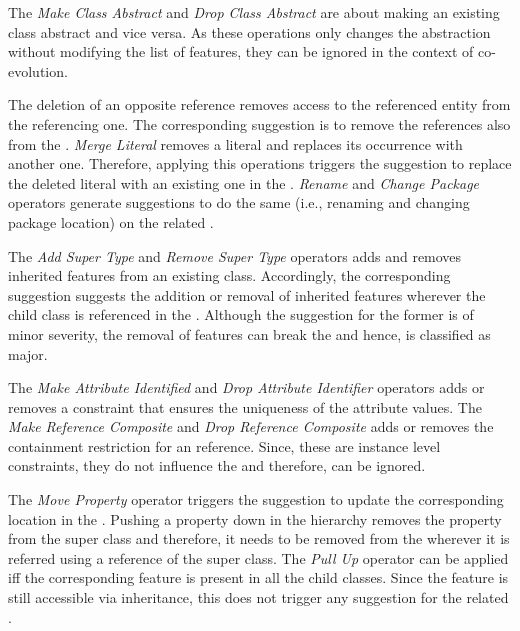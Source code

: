 The \textit{Make Class Abstract} and \textit{Drop Class Abstract} are about making an existing class abstract and vice versa. As these operations only changes the abstraction without modifying the list of features, they can be ignored in the context of \viewtype co-evolution. 

The deletion of an opposite reference removes access to the referenced entity from the referencing one. The corresponding suggestion is to remove the references also from the \viewtype. \textit{Merge Literal} removes a literal and replaces its occurrence with another one. Therefore, applying this operations triggers the suggestion to replace the deleted literal with an existing one in the \viewtype. \textit{Rename} and \textit{Change Package} operators generate suggestions to do the same (i.e., renaming and changing package location) on the related \viewtypes.

The \textit{Add Super Type} and \textit{Remove Super Type} operators adds and removes inherited features from an existing class. Accordingly, the corresponding suggestion suggests the addition or removal of inherited features wherever the child class is referenced in the \viewtype. Although the suggestion for the former is of minor severity, the removal of features can break the \viewtype and hence, is classified as major.

The \textit{Make Attribute Identified} and \textit{Drop Attribute Identifier} operators adds or removes a constraint that ensures the uniqueness of the attribute values. The \textit{Make Reference Composite} and \textit{Drop Reference Composite} adds or removes the containment restriction for an reference. Since, these are instance level constraints, they do not influence the \viewtype and therefore, can be ignored.


The \textit{Move Property} operator triggers the suggestion to update the corresponding location in the \viewtype. Pushing a property down in the hierarchy removes the property from the super class and therefore, it needs to be removed from the \viewtype wherever it is referred using a reference of the super class. The \textit{Pull Up} operator can be applied iff the corresponding feature is present in all the child classes. Since the feature is still accessible via inheritance, this does not trigger any suggestion for the related \viewtypes.

